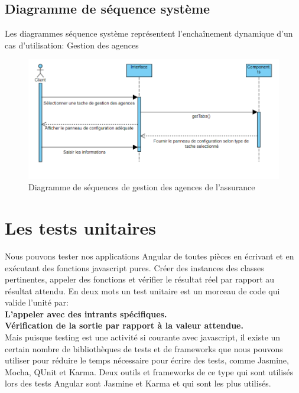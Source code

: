 \subsection{Diagramme de séquence système}
Les diagrammes séquence système représentent l’enchaînement dynamique d’un cas d’utilisation: Gestion des agences
\begin{figure}[H]
\centering
\includegraphics[width=1\columnwidth]{images/seq.PNG}
\caption{Diagramme de séquences de gestion des agences de l'assurance}
\label{fig:Diagramme de cas d'utilisation sprint 1}
\end{figure}





\section{Les tests unitaires}
Nous pouvons tester nos applications Angular de toutes pièces en écrivant et en exécutant des fonctions javascript pures. Créer des instances des classes pertinentes, appeler des fonctions et vérifier le résultat réel par rapport au résultat attendu.
En deux mots un test unitaire est un morceau de code qui valide l'unité par:\\
\textbf{L'appeler avec des intrants spécifiques.}\\
\textbf{Vérification de la sortie par rapport à la valeur attendue.}\\
Mais puisque testing est une activité si courante avec javascript, il existe un certain nombre de bibliothèques de tests et de frameworks que nous pouvons utiliser pour réduire le temps nécessaire pour écrire des tests, comme Jasmine, Mocha, QUnit et Karma.
Deux outils et frameworks de ce type qui sont utilisés lors des tests Angular sont Jasmine et Karma et qui sont les plus utilisés.
